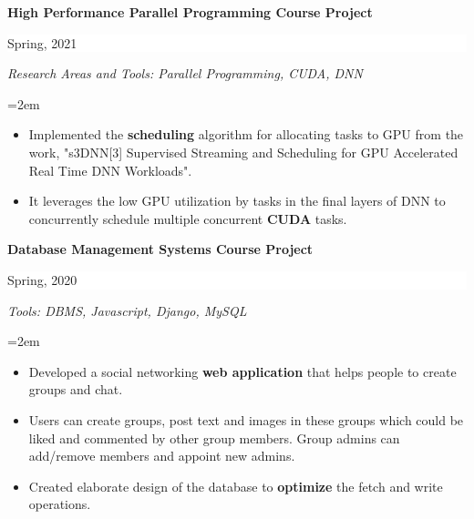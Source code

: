 \documentclass[paper=a4,fontsize=10pt]{scrartcl} %
\newcommand{\sepspace}{\vspace*{1em}}		%
\newcommand{\EducationEntry}[4]{
		\noindent \textbf{#1} \hfill      %
		\colorbox{White}{%
			\parbox{6em}{%
			\hfill\color{Black}#2}} \par  %
		\noindent \textit{#3} \par        %
		\noindent\hangindent=2em\hangafter=0 \small #4 %
		\normalsize \par}
\begin{document}


\EducationEntry{High Performance Parallel Programming Course Project}{Spring, 2021}{Research Areas and Tools: Parallel Programming, CUDA, DNN}{
\begin{itemize}[noitemsep]
  \item Implemented the \textbf{scheduling} algorithm for allocating tasks to GPU from the work, "s3DNN[3] Supervised Streaming and Scheduling for GPU Accelerated Real Time DNN Workloads".
  \item It leverages the low GPU utilization by tasks in the final layers of DNN to concurrently schedule multiple concurrent \textbf{CUDA} tasks.
\end{itemize}
}

\EducationEntry{Database Management Systems Course Project}{Spring, 2020}{Tools: DBMS, Javascript, Django, MySQL}{
\begin{itemize}[noitemsep]
  \item Developed a social networking \textbf{web application} that helps people to create groups and chat.
  \item Users can create groups, post text and images in these groups which could be liked and commented by other group members. Group admins can add/remove members and appoint new admins.
  \item Created elaborate design of the database to \textbf{optimize} the fetch and write operations.
\end{itemize}
}
\end{document}
